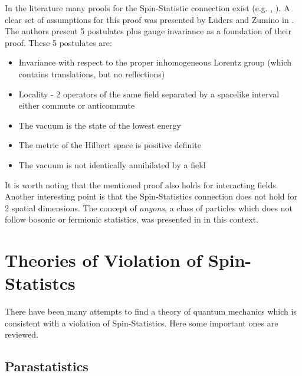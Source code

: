 In the literature many proofs for the Spin-Statistic connection exist (e.g. \cite{Pauli1940}, \cite{Schwinger1958}). A clear set of assumptions for this proof was presented by Lüders and Zumino in \cite{Luders1958}. The authors present 5 postulates plus gauge invariance as a foundation of their proof. These 5 postulates are:
\begin{itemize}
 \item Invariance with respect to the proper inhomogeneous Lorentz group (which contains translations, but no reflections)
 \item Locality - 2 operators of the same field separated by a spacelike interval either commute or anticommute
 \item The vacuum is the state of the lowest energy
 \item The metric of the Hilbert space is positive definite
 \item The vacuum is not identically annihilated by a field
\end{itemize}
It is worth noting that the mentioned proof also holds for interacting fields. Another interesting point is that the Spin-Statistics connection does not hold for 2 spatial dimensions. The concept of \textit{anyons}, a class of particles which does not follow bosonic or fermionic statistics, was presented in \cite{Stern2008} in this context.

\section{Theories of Violation of Spin-Statistcs}

There have been many attempts to find a theory of quantum mechanics which is consistent with a violation of Spin-Statistics. Here some important ones are reviewed.

\subsection{Parastatistics}

